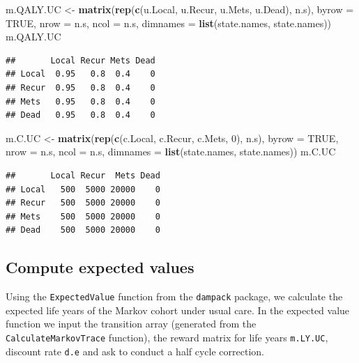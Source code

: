\documentclass[]{article}
\newenvironment{Shaded}{\begin{snugshade}}{\end{snugshade}}
\newcommand{\KeywordTok}[1]{\textcolor[rgb]{0.13,0.29,0.53}{\textbf{#1}}}
\newcommand{\DataTypeTok}[1]{\textcolor[rgb]{0.13,0.29,0.53}{#1}}
\newcommand{\DecValTok}[1]{\textcolor[rgb]{0.00,0.00,0.81}{#1}}
\newcommand{\StringTok}[1]{\textcolor[rgb]{0.31,0.60,0.02}{#1}}
\newcommand{\OtherTok}[1]{\textcolor[rgb]{0.56,0.35,0.01}{#1}}
\newcommand{\NormalTok}[1]{#1}
\theoremstyle{definition}
\theoremstyle{definition}
\theoremstyle{definition}
\theoremstyle{remark}
\begin{document}
\begin{Shaded}
\begin{Highlighting}[]
\NormalTok{m.QALY.UC <-}\StringTok{ }\KeywordTok{matrix}\NormalTok{(}\KeywordTok{rep}\NormalTok{(}\KeywordTok{c}\NormalTok{(u.Local, u.Recur, u.Mets, u.Dead), n.s),}
                    \DataTypeTok{byrow =} \OtherTok{TRUE}\NormalTok{,}
                 \DataTypeTok{nrow =}\NormalTok{ n.s, }\DataTypeTok{ncol =}\NormalTok{ n.s, }
                 \DataTypeTok{dimnames =} \KeywordTok{list}\NormalTok{(state.names, state.names))}
\NormalTok{m.QALY.UC}
\end{Highlighting}
\end{Shaded}

\begin{verbatim}
##       Local Recur Mets Dead
## Local  0.95   0.8  0.4    0
## Recur  0.95   0.8  0.4    0
## Mets   0.95   0.8  0.4    0
## Dead   0.95   0.8  0.4    0
\end{verbatim}

\begin{Shaded}
\begin{Highlighting}[]
\NormalTok{m.C.UC <-}\StringTok{ }\KeywordTok{matrix}\NormalTok{(}\KeywordTok{rep}\NormalTok{(}\KeywordTok{c}\NormalTok{(c.Local, c.Recur, c.Mets, }\DecValTok{0}\NormalTok{), n.s),}
                 \DataTypeTok{byrow =} \OtherTok{TRUE}\NormalTok{,}
                 \DataTypeTok{nrow =}\NormalTok{ n.s, }\DataTypeTok{ncol =}\NormalTok{ n.s, }
                 \DataTypeTok{dimnames =} \KeywordTok{list}\NormalTok{(state.names, state.names))}
\NormalTok{m.C.UC}
\end{Highlighting}
\end{Shaded}

\begin{verbatim}
##       Local Recur  Mets Dead
## Local   500  5000 20000    0
## Recur   500  5000 20000    0
## Mets    500  5000 20000    0
## Dead    500  5000 20000    0
\end{verbatim}

\subsection{Compute expected values}\label{compute-expected-values}

Using the \texttt{ExpectedValue} function from the \texttt{dampack}
package, we calculate the expected life years of the Markov cohort under
usual care. In the expected value function we input the transition array
(generated from the \texttt{CalculateMarkovTrace} function), the reward
matrix for life years \texttt{m.LY.UC}, discount rate \texttt{d.e} and
ask to conduct a half cycle correction.
\end{document}

